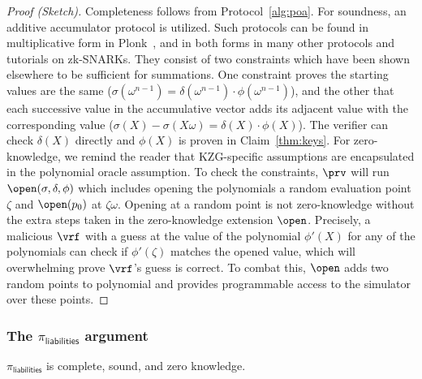 \begin{proof}[Proof (Sketch)] Completeness follows from Protocol~\ref{alg:poa}. For soundness, an additive accumulator protocol is utilized. Such protocols can be found in multiplicative form in Plonk~\cite{plonk}, and in both forms in many other protocols and tutorials on zk-SNARKs. They consist of two constraints which have been shown elsewhere to be sufficient for summations. One  constraint proves the starting values are the same ($\sigma(\omega^{n-1})=\delta(\omega^{n-1})\cdot\phi(\omega^{n-1})$), and the other that each successive value in the accumulative vector adds its adjacent value with the corresponding value ($\sigma(X)-\sigma(X\omega)=\delta(X)\cdot\phi(X)$). The verifier can check $\delta(X)$ directly and $\phi(X)$ is proven in Claim~\ref{thm:keys}. For zero-knowledge, we remind the reader that KZG-specific assumptions are encapsulated in the polynomial oracle assumption. To check the constraints, $\prv$ will run $\open(\sigma,\delta,\phi)$ which includes opening the polynomials a random evaluation point $\zeta$ and $\open(p_0)$ at $\zeta\omega$. 
 Opening  at a random point is not zero-knowledge without the extra steps taken in the zero-knowledge extension $\open$. Precisely, a malicious $\vrf$ with a guess at the value of the polynomial $\phi'(X)$ for any of the polynomials can check if $\phi'(\zeta)$ matches the opened value, which will overwhelming prove $\vrf$'s guess is correct. To combat this, $\open$ adds two random points to polynomial and provides programmable access to the simulator over these points. \end{proof}


\subsubsection{The $\pi_\mathsf{liabilities}$ argument}

\begin{claim}\label{thm:liabilities} $\pi_\mathsf{liabilities}$ is complete, sound, and zero knowledge. \end{claim}

